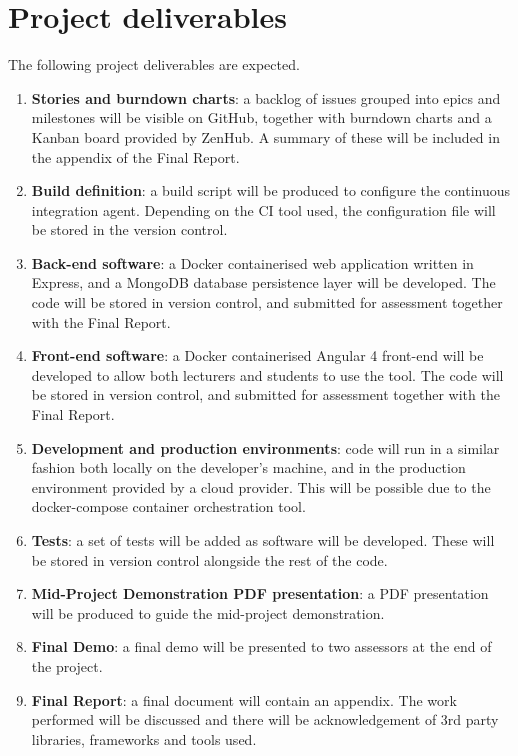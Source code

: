 \documentclass[11pt,fleqn,twoside]{article}
\begin{document}
\section{Project deliverables}
The following project deliverables are expected.
\begin{enumerate}
  \item \textbf{Stories and burndown charts}: a backlog of issues grouped into epics and milestones will be
    visible on GitHub, together with burndown charts and a Kanban board provided by ZenHub\cite{11}. A summary of these
    will be included in the appendix of the Final Report.
  \item \textbf{Build definition}: a build script will be produced to configure the continuous integration agent.
    Depending on the CI tool used, the configuration file will be stored in the version control.
  \item \textbf{Back-end software}: a Docker containerised web application written in Express, and a MongoDB database
    persistence layer will be developed. The code will be stored in version control, and submitted for assessment
    together with the Final Report.
  \item \textbf{Front-end software}: a Docker containerised Angular 4 front-end will be developed to allow both
    lecturers and students to use the tool. The code will be stored in version control, and submitted for assessment
    together with the Final Report.
  \item \textbf{Development and production environments}: code will run in a similar fashion both locally on the developer's
    machine, and in the production environment provided by a cloud provider. This will be possible due to the docker-compose
    container orchestration tool.
  \item \textbf{Tests}: a set of tests will be added as software will be developed. These will be stored in version
    control alongside the rest of the code.
  \item \textbf{Mid-Project Demonstration PDF presentation}: a PDF presentation will be produced to guide the
    mid-project demonstration.
  \item \textbf{Final Demo}: a final demo will be presented to two assessors at the end of the project.
  \item \textbf{Final Report}: a final document will contain an appendix. The work performed will be
    discussed and there will be acknowledgement of 3rd party libraries, frameworks and tools used.

\end{enumerate}
\end{document}
